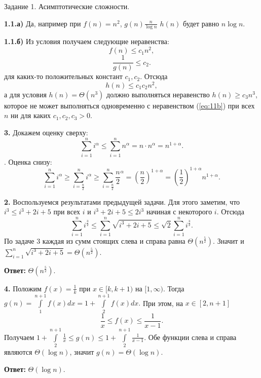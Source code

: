 \documentclass{article}
\begin{document}
\begin{center}
  \Large {Задание 1. Асимптотические сложности.}
\end{center}

\bigskip

\textbf{1.1.а)} Да, например при \( f(n) = n^2 \), \( g(n)
\frac{n}{\log{n}} \) \( h(n) \) будет равно \( n\log n \).

\textbf{1.1.б)} Из условия получаем следующие неравенства:
\[
f(n) \le c_1 n^2,
\]
\[
\frac 1 {g(n)} \le c_2.
\]
для каких-то положительных констант \( c_1, c_2 \). Отсюда
\begin{equation}
h(n) \le c_1 c_2 n^2, \label{eq:11b}
\end{equation}  а для условия \( h(n) = \Theta (n^3) \) должно
выполняться неравенство \( h(n) \ge c_3 n^3 \), которое не может
выполняться одновременно с неравенством (\ref{eq:11b}) при всех \( n
\) ни для каких \( c_1,c_2,c_3 > 0 \).
\medskip

\textbf{3.} Докажем оценку сверху:
\[
\sum\limits_{i=1}^n i^\alpha \le  \sum\limits_{i=1}^n n^\alpha =
n\cdot n^\alpha = n^{1+\alpha}.
\]
. Оценка снизу:
\[
\sum\limits_{i=1}^n i^\alpha \ge \sum\limits_{i=\frac n 2}^n i^\alpha
\ge \sum\limits_{i=\frac n 2}^n {\frac n 2}^\alpha = \left(\frac n
2\right)^{1+\alpha } =\left(\frac{1}{2}\right)^{1+\alpha }n^{1+\alpha }.
\]

\medskip

\textbf{2.} Воспользуемся результатами предыдущей задачи. Для этого заметим,
что \( i^3 \le i^3 + 2i + 5 \) при всех \( i \) и \( i^3 + 2i + 5 \le 2i^3 \)
начиная с некоторого \( i \). Отсюда
\[
\sum\limits_{i=1}^n i^{\frac 3 2} \le \sum\limits_{i=1}^n
\sqrt{i^3+2i+5} \le \sqrt 2 \sum\limits_{i=1}^n i^{\frac 3 2}.
\]
По задаче 3 каждая из сумм стоящих слева и справа равна \( \Theta
(n^{\frac 5 2}). \) Значит и \( \sum\limits_{i=1}^n \sqrt{i^3+2i+5} =
\Theta (n^{\frac 5 2}) \).

\textbf{Ответ:} \( \Theta (n^\frac 5 2). \)
\medskip

\textbf{4.} Положим \( f(x) = \frac 1 k \) при \( x \in [k,k+1) \) на
\( [1,\infty) \). Тогда \( g(n) = \int\limits_1^{n+1} f(x)dx = 1 +
\int\limits_2^{n+1} f(x)dx. \) При этом, на \( x\in[2,n+1] \)
\[
\frac 1 {x} \le f(x) \le \frac 1 {x-1}.
\]
Получаем \( 1 + \int\limits_2^{n+1} \frac 1 {x}  \le g(n) \le  1 +
\int\limits_2^{n+1} \frac 1 {x-1}\). Обе функции слева и справа
являются \( \Theta (\log n) \), значит \( g(n) = \Theta (\log n) \).

\textbf{Ответ:} \( \Theta (\log n). \)
\medskip
\end{document}
